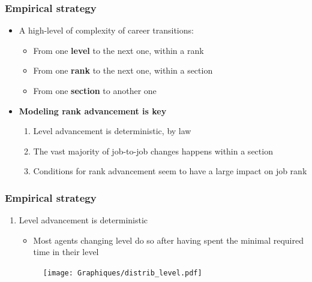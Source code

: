 \documentclass[xcolor=table,ignorenonframetext,12pt]{beamer}
\newcounter{sauvegardeenumi}
\newcommand{\asuivre}{\setcounter{sauvegardeenumi}{\theenumi}}
\begin{document}
\begin{frame}
\frametitle{Empirical strategy}
\begin{itemize}
\item A high-level of complexity of career transitions:
\begin{itemize}
	\item From one \textbf{level} to the next one, within a rank
	\item From one \textbf{rank} to the next one, within a section
	\item From one \textbf{section} to another one
\end{itemize}
\item \textbf{Modeling rank advancement is key}
\begin{enumerate}
	\item Level advancement is deterministic, by law
	\item The vast majority of job-to-job changes happens within a section %
	\item Conditions for rank advancement seem to have a large impact on job rank
\end{enumerate}
\end{itemize}
\end{frame}





\begin{frame}
\frametitle{Empirical strategy}
\begin{enumerate}
\item Level advancement is deterministic
\begin{itemize}
\item Most agents changing level do so after having spent the minimal required time in their level
\end{itemize}
\vspace{-0.1cm}
\begin{center}
\begin{figure}
	\texttt{[image: Graphiques/distrib\_level.pdf]}
\end{figure}
\end{center}
\asuivre
\end{enumerate}
\end{frame}
\end{document}
